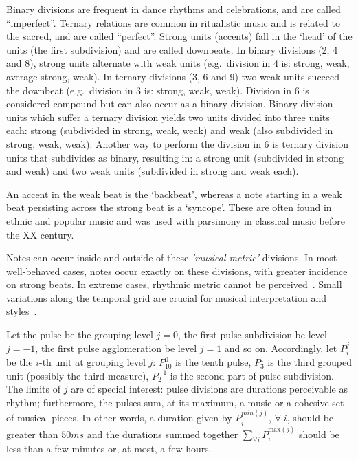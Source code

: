 Binary divisions are frequent in dance rhythms and celebrations, and are called ``imperfect''. Ternary relations are common in
ritualistic music and is related to the sacred, and are called ``perfect''. Strong units (accents) fall in the `head' of the units (the first subdivision) and are called downbeats. In binary divisions (2, 4
and 8), strong units alternate with weak units
(e.g.\ division in 4 is: strong, weak, average strong, weak). In ternary divisions
(3, 6 and 9) two weak units succeed the downbeat (e.g.\ division in 3 is:
strong, weak, weak). Division in 6 is considered compound but can also
occur as a binary division. Binary division units which suffer a ternary division yields two units divided into three units each: strong (subdivided in strong,
weak, weak) and weak (also subdivided in strong, weak, weak). Another way to perform
the division in 6 is ternary division units that subdivides as binary,
resulting in: a strong unit (subdivided in strong and weak) and two weak units
(subdivided in strong and weak each).

An accent in the weak beat is the `backbeat', whereas a note starting in a weak beat persisting across the strong beat is a `syncope'.
These are often found in ethnic and popular music and was used with parsimony in classical music before the XX century.

Notes can occur inside and outside of these \emph{'musical metric'} divisions. In most well-behaved cases, notes occur exactly on these divisions, with greater incidence on strong beats.
In extreme cases, rhythmic metric cannot be perceived~\cite{Roederer}. 
Small variations along the temporal grid are crucial for musical interpretation and
styles~\cite{Cook}.

Let the pulse be the grouping level $j=0$, the first pulse subdivision be level $j=-1$,
the first pulse agglomeration be level $j=1$ and so on. Accordingly, let $P_i^j$ be the $i$-th unit at grouping level $j$: $P^0_{10}$ is the tenth pulse, $P^{1}_3$ is the third grouped unit (possibly the third measure),
$P^{-1}_2$ is the second part of pulse subdivision. The limits of $j$ are of special interest: pulse divisions are durations perceivable as rhythm; furthermore, the pulses sum, at its maximum, a music or a cohesive set of musical pieces. In other words, a duration given
by $P^{min(j)}_i$, $\forall \; i$, should be greater than $50 ms$ and the durations
summed together $\sum_{\forall i}P^{\text{max}(j)}_i$ should be less than a few
minutes or, at most, a few hours.

